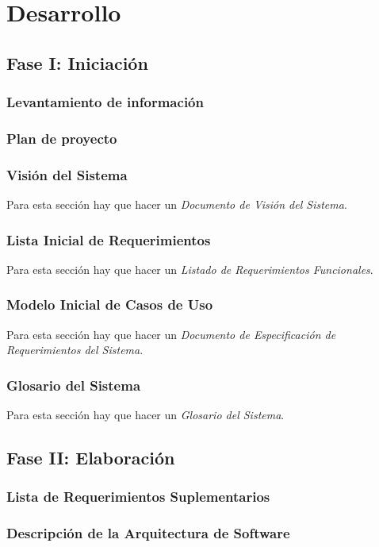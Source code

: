 \chapter{Desarrollo}

\section{Fase I: Iniciación}
\subsection{Levantamiento de información}
\subsection{Plan de proyecto}
\subsection{Visión del Sistema}
Para esta sección hay que hacer un \textit{Documento de Visión del Sistema}.
\subsection{Lista Inicial de Requerimientos}
Para esta sección hay que hacer un \textit{Listado de Requerimientos Funcionales}.
\subsection{Modelo Inicial de Casos de Uso}
Para esta sección hay que hacer un \textit{Documento de Especificación de Requerimientos del Sistema}.
\subsection{Glosario del Sistema}
Para esta sección hay que hacer un \textit{Glosario del Sistema}.

\section{Fase II: Elaboración}
\subsection{Lista de Requerimientos Suplementarios}

\subsection{Descripción de la Arquitectura de Software}
